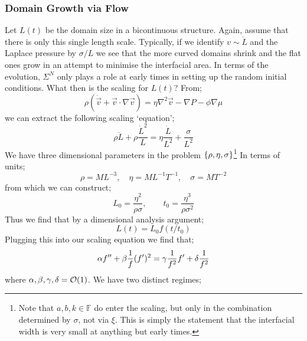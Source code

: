\subsubsection*{Domain Growth via Flow}
Let $L(t)$ be the domain size in a bicontinuous structure. Again, assume that there is only this single length scale. Typically, if we identify $v \sim \dot{L}$ and the Laplace pressure by $\sigma/L$ we see that the more curved domains shrink and the flat ones grow in an attempt to minimise the interfacial area. In terms of the evolution, $\Sigma^N$ only plays a role at early times in setting up the random initial conditions. What then is the scaling for $L(t)$? From;
\begin{equation*}
\rho(\dot{\vec{v}} + \vec{v}\cdot \nabla \vec{v}) = \eta \nabla^2 \vec{v} - \nabla P - \phi \nabla\mu
\end{equation*}
we can extract the following scaling `equation';
\begin{equation*}
\rho \ddot{L} + \rho \frac{\dot{L}^2}{L} = \eta \frac{\dot{L}}{L^2} + \frac{\sigma}{L^2}
\end{equation*}
We have three dimensional parameters in the problem $\set{\rho, \eta, \sigma}$\footnote{Note that $a, b, k \in \mathbb{F}$ do enter the scaling, but only in the combination determined by $\sigma$, not via $\xi$. This is simply the statement that the interfacial width is very small at anything but early times.} In terms of units;
\begin{equation*}
\rho = ML^{-3}, \quad \eta = ML^{-1}T^{-1}, \quad \sigma = MT^{-2}
\end{equation*}
from which we can construct;
\begin{equation}
L_0 = \frac{\eta^2}{\rho\sigma}, \qquad t_0 = \frac{\eta^3}{\rho \sigma^2}
\end{equation}
Thus we find that by a dimensional analysis argument;
\begin{equation}
L(t) = L_0 f(t/t_0)
\end{equation}
Plugging this into our scaling equation we find that;
\begin{equation*}
\alpha f^{\prime\prime} + \beta \frac{1}{f}(f^{\prime})^2 = \gamma \frac{1}{f^2}f^{\prime} + \delta \frac{1}{f^2}
\end{equation*}
where $\alpha, \beta, \gamma, \delta = \mathcal{O}(1)$. We have two distinct regimes;
